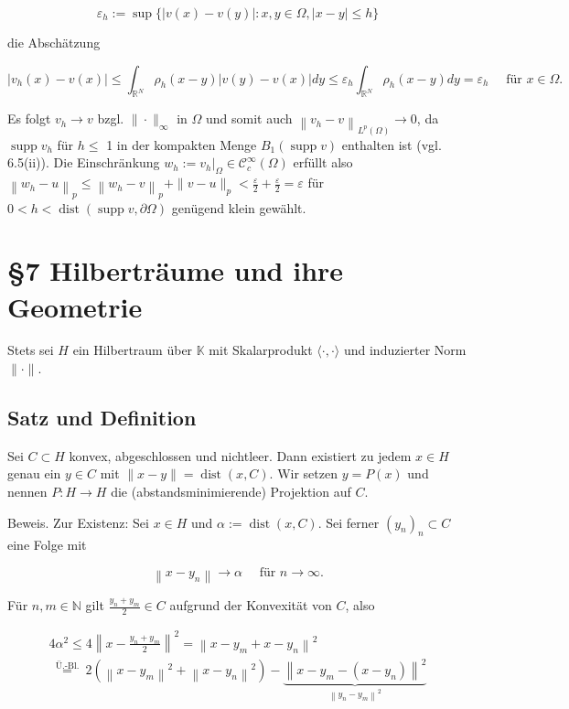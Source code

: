 \documentclass[10pt, letterpaper]{article}
\begin{document}
$$
\varepsilon_{h}:=\sup \{|v(x)-v(y)|: x, y \in \Omega,|x-y| \leq h\}
$$

die Abschätzung

$$
\left|v_{h}(x)-v(x)\right| \leq \int_{\mathbb{R}^{N}} \rho_{h}(x-y)|v(y)-v(x)| d y \leq \varepsilon_{h} \int_{\mathbb{R}^{N}} \rho_{h}(x-y) d y=\varepsilon_{h} \quad \text { für } x \in \Omega .
$$

Es folgt $v_{h} \rightarrow v$ bzgl. $\|\cdot\|_{\infty}$ in $\Omega$ und somit auch $\left\|v_{h}-v\right\|_{L^{p}(\Omega)} \rightarrow 0$, da $\operatorname{supp} v_{h}$ für $h \leq$ 1 in der kompakten Menge $B_{1}(\operatorname{supp} v)$ enthalten ist (vgl. 6.5(ii)). Die Einschränkung $w_{h}:=\left.v_{h}\right|_{\Omega} \in \mathcal{C}_{c}^{\infty}(\Omega)$ erfüllt also $\left\|w_{h}-u\right\|_{p} \leq\left\|w_{h}-v\right\|_{p}+\|v-u\|_{p}<\frac{\varepsilon}{2}+\frac{\varepsilon}{2}=\varepsilon$ für $0<h<\operatorname{dist}(\operatorname{supp} v, \partial \Omega)$ genügend klein gewählt.

\section*{§7 Hilberträume und ihre Geometrie}
Stets sei $H$ ein Hilbertraum über $\mathbb{K}$ mit Skalarprodukt $\langle\cdot, \cdot\rangle$ und induzierter Norm $\|\cdot\|$.

\subsection*{Satz und Definition}
Sei $C \subset H$ konvex, abgeschlossen und nichtleer. Dann existiert zu jedem $x \in H$ genau ein $y \in C$ mit $\|x-y\|=\operatorname{dist}(x, C)$. Wir setzen $y=P(x)$ und nennen $P: H \rightarrow H$ die (abstandsminimierende) Projektion auf $C$.

Beweis. Zur Existenz: Sei $x \in H$ und $\alpha:=\operatorname{dist}(x, C)$. Sei ferner $\left(y_{n}\right)_{n} \subset C$ eine Folge mit

$$
\left\|x-y_{n}\right\| \rightarrow \alpha \quad \text { für } n \rightarrow \infty .
$$

Für $n, m \in \mathbb{N}$ gilt $\frac{y_{n}+y_{m}}{2} \in C$ aufgrund der Konvexität von $C$, also

$$
\begin{aligned}
4 \alpha^{2} \leq 4\left\|x-\frac{y_{n}+y_{m}}{2}\right\|^{2}=\left\|x-y_{m}+x-y_{n}\right\|^{2} \\
\stackrel{\text { Ü.-Bl. }}{=} 2\left(\left\|x-y_{m}\right\|^{2}+\left\|x-y_{n}\right\|^{2}\right)-\underbrace{\left\|x-y_{m}-\left(x-y_{n}\right)\right\|^{2}}_{\left\|y_{n}-y_{m}\right\|^{2}}
\end{aligned}
$$
\end{document}
